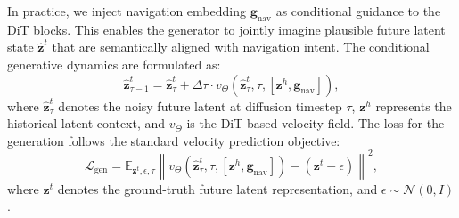 In practice, we inject navigation embedding $\mathbf{g}_{\text{nav}}$ as conditional guidance to the DiT blocks. This enables the generator to jointly imagine plausible future latent state $\hat{\mathbf{z}}^{t}$ that are semantically aligned with navigation intent. The conditional generative dynamics are formulated as:
\begin{equation}
    \hat{\mathbf{z}}^{t}_{\tau-1} = 
    \hat{\mathbf{z}}^{t}_{\tau} + \Delta \tau \cdot v_{\Theta}\left(\hat{\mathbf{z}}^{t}_{\tau}, \tau, [\mathbf{z}^{h}, \mathbf{g}_{\text{nav}}]\right),
    \label{eq:stage1}
\end{equation}
where $\hat{\mathbf{z}}^{t}_{\tau}$ denotes the noisy future latent at diffusion timestep $\tau$, $\mathbf{z}^{h}$ represents the historical latent context, and $v_{\Theta}$ is the DiT-based velocity field. The loss for the generation follows the standard velocity prediction objective:
\begin{equation}
    \mathcal{L}_{\text{gen}} = 
    \mathbb{E}_{\mathbf{z}^{t}, \epsilon, \tau}
    \left\|v_{\Theta}\left(\hat{\mathbf{z}}^{t}_{\tau}, \tau, [\mathbf{z}^{h}, \mathbf{g}_{\text{nav}}]\right)
    - (\mathbf{z}^{t} - \epsilon)\right\|^{2},
    \label{eq:loss1}
\end{equation}
where $\mathbf{z}^{t}$ denotes the ground-truth future latent representation, and $\epsilon \sim \mathcal{N}(0, I)$.